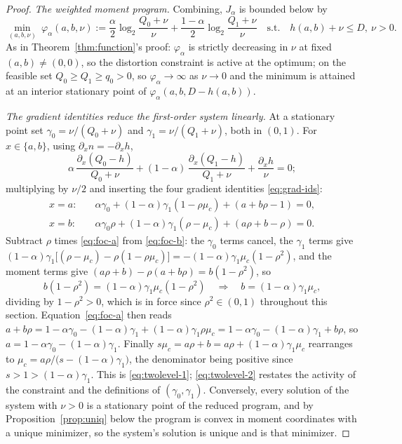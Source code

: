﻿\documentclass[11pt,onecolumn]{IEEEtran}
\begin{document}
\begin{proof}
\emph{The weighted moment program.} Combining, $J_\alpha$ is bounded
below by
\begin{equation}
\min_{(a,b,\nu)}\ \varphi_\alpha(a,b,\nu):=
\frac\alpha2\log_2\frac{Q_0+\nu}{\nu}
+\frac{1-\alpha}2\log_2\frac{Q_1+\nu}{\nu}
\quad\text{s.t.}\quad h(a,b)+\nu\le D,\ \nu>0 .
\label{eq:weighted-program}
\end{equation}
As in Theorem~\ref{thm:function}'s proof: $\varphi_\alpha$ is strictly
decreasing in $\nu$ at fixed $(a,b)\ne(0,0)$, so the distortion
constraint is active at the optimum; on the feasible set
$Q_0\ge Q_1\ge q_0>0$, so $\varphi_\alpha\to\infty$ as $\nu\to0$ and the
minimum is attained at an interior stationary point of
$\varphi_\alpha(a,b,D-h(a,b))$.

\emph{The gradient identities reduce the first-order system linearly.}
At a stationary point set $\gamma_0=\nu/(Q_0+\nu)$ and
$\gamma_1=\nu/(Q_1+\nu)$, both in $(0,1)$. For $x\in\{a,b\}$, using
$\partial_xn=-\partial_xh$,
\[
\alpha\,\frac{\partial_x(Q_0-h)}{Q_0+\nu}
+(1-\alpha)\,\frac{\partial_x(Q_1-h)}{Q_1+\nu}
+\frac{\partial_xh}{\nu}=0 ;
\]
multiplying by $\nu/2$ and inserting the four gradient identities
\eqref{eq:grad-ids}:
\begin{align}
x=a:&\quad
\alpha\gamma_0+(1-\alpha)\gamma_1(1-\rho\mu_c)+(a+b\rho-1)=0,
\label{eq:foc-a}\\
x=b:&\quad
\alpha\gamma_0\rho+(1-\alpha)\gamma_1(\rho-\mu_c)+(a\rho+b-\rho)=0 .
\label{eq:foc-b}
\end{align}
Subtract $\rho$ times \eqref{eq:foc-a} from \eqref{eq:foc-b}: the
$\gamma_0$ terms cancel, the $\gamma_1$ terms give
$(1-\alpha)\gamma_1\bigl[(\rho-\mu_c)-\rho(1-\rho\mu_c)\bigr]
=-(1-\alpha)\gamma_1\mu_c(1-\rho^2)$, and the moment terms give
$(a\rho+b)-\rho(a+b\rho)=b(1-\rho^2)$, so
\[
b(1-\rho^2)=(1-\alpha)\gamma_1\mu_c(1-\rho^2)
\quad\Longrightarrow\quad
b=(1-\alpha)\gamma_1\mu_c ,
\]
dividing by $1-\rho^2>0$, which is in force since $\rho^2\in(0,1)$
throughout this section.
Equation~\eqref{eq:foc-a} then reads
$a+b\rho=1-\alpha\gamma_0-(1-\alpha)\gamma_1+(1-\alpha)\gamma_1\rho\mu_c
=1-\alpha\gamma_0-(1-\alpha)\gamma_1+b\rho$, so
$a=1-\alpha\gamma_0-(1-\alpha)\gamma_1$. Finally
$s\mu_c=a\rho+b=a\rho+(1-\alpha)\gamma_1\mu_c$ rearranges to
$\mu_c=a\rho/\bigl(s-(1-\alpha)\gamma_1\bigr)$, the denominator being
positive since $s>1>(1-\alpha)\gamma_1$. This is
\eqref{eq:twolevel-1}; \eqref{eq:twolevel-2} restates the activity of
the constraint and the definitions of $(\gamma_0,\gamma_1)$.
Conversely, every solution of the system with $\nu>0$ is a stationary
point of the reduced program, and by Proposition~\ref{prop:uniq} below
the program is convex in moment coordinates with a unique minimizer, so
the system's solution is unique and is that minimizer.


\end{proof}
\end{document}
